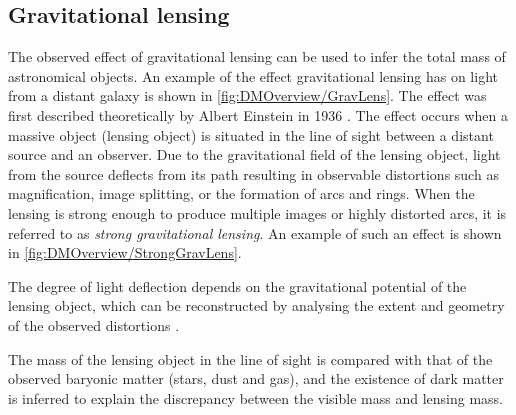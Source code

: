 \subsection{Gravitational lensing}\label{sec:DMOverview/GravLens}
The observed effect of gravitational lensing can be used to infer the total mass of astronomical objects. An example of the effect gravitational lensing has on light from a distant galaxy is shown in \autoref{fig:DMOverview/GravLens}. The effect was first described theoretically by Albert Einstein in 1936 \cite{GravLens}. The effect occurs when a massive object (lensing object) is situated in the line of sight between a distant source and an observer. Due to the gravitational field of the lensing object, light from the source deflects from its path resulting in observable distortions such as magnification, image splitting, or the formation of arcs and rings.
When the lensing is strong enough to produce multiple images or highly distorted arcs, it is referred to as \textit{strong gravitational lensing}. An example of such an effect is shown in \autoref{fig:DMOverview/StrongGravLens}. 

The degree of light deflection depends on the gravitational potential of the lensing object, which can be reconstructed by analysing the extent and geometry of the observed distortions \cite{Young2016}. 

The mass of the lensing object in the line of sight is compared with that of the observed baryonic matter (stars, dust and gas), and the existence of dark matter is inferred to explain the discrepancy between the visible mass and lensing mass. 

